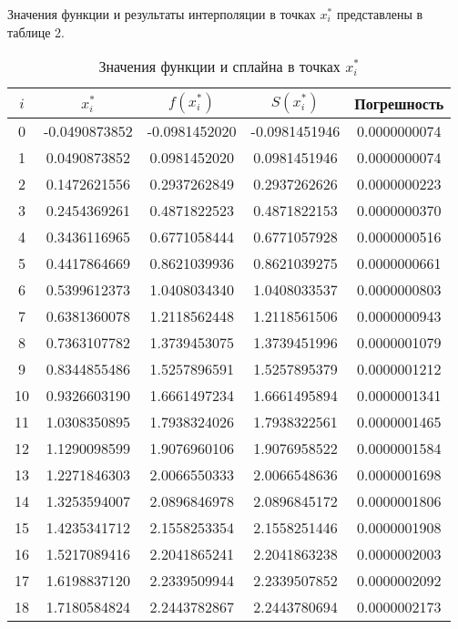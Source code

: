\documentclass[a4paper, 14pt]{extarticle}
\begin{document}
Значения функции и результаты интерполяции в точках \(x_i^*\) представлены в таблице 2.
\begin{table}[h!]
    \centering
    \caption{Значения функции и сплайна в точках \(x_i^*\)}
    \begin{tabular}{|c|c|c|c|c|}
    \hline
    \(i\) & \(x_i^*\) & \(f(x_i^*)\) & \(S(x_i^*)\) & Погрешность \\ \hline
    0 & -0.0490873852 & -0.0981452020 & -0.0981451946 & 0.0000000074 \\ \hline
    1 & 0.0490873852 & 0.0981452020 & 0.0981451946 & 0.0000000074 \\ \hline
    2 & 0.1472621556 & 0.2937262849 & 0.2937262626 & 0.0000000223 \\ \hline
    3 & 0.2454369261 & 0.4871822523 & 0.4871822153 & 0.0000000370 \\ \hline
    4 & 0.3436116965 & 0.6771058444 & 0.6771057928 & 0.0000000516 \\ \hline
    5 & 0.4417864669 & 0.8621039936 & 0.8621039275 & 0.0000000661 \\ \hline
    6 & 0.5399612373 & 1.0408034340 & 1.0408033537 & 0.0000000803 \\ \hline
    7 & 0.6381360078 & 1.2118562448 & 1.2118561506 & 0.0000000943 \\ \hline
    8 & 0.7363107782 & 1.3739453075 & 1.3739451996 & 0.0000001079 \\ \hline
    9 & 0.8344855486 & 1.5257896591 & 1.5257895379 & 0.0000001212 \\ \hline
    10 & 0.9326603190 & 1.6661497234 & 1.6661495894 & 0.0000001341 \\ \hline
    11 & 1.0308350895 & 1.7938324026 & 1.7938322561 & 0.0000001465 \\ \hline
    12 & 1.1290098599 & 1.9076960106 & 1.9076958522 & 0.0000001584 \\ \hline
    13 & 1.2271846303 & 2.0066550333 & 2.0066548636 & 0.0000001698 \\ \hline
    14 & 1.3253594007 & 2.0896846978 & 2.0896845172 & 0.0000001806 \\ \hline
    15 & 1.4235341712 & 2.1558253354 & 2.1558251446 & 0.0000001908 \\ \hline
    16 & 1.5217089416 & 2.2041865241 & 2.2041863238 & 0.0000002003 \\ \hline
    17 & 1.6198837120 & 2.2339509944 & 2.2339507852 & 0.0000002092 \\ \hline
    18 & 1.7180584824 & 2.2443782867 & 2.2443780694 & 0.0000002173 \\ \hline

\end{tabular}
\end{table}
\end{document}
